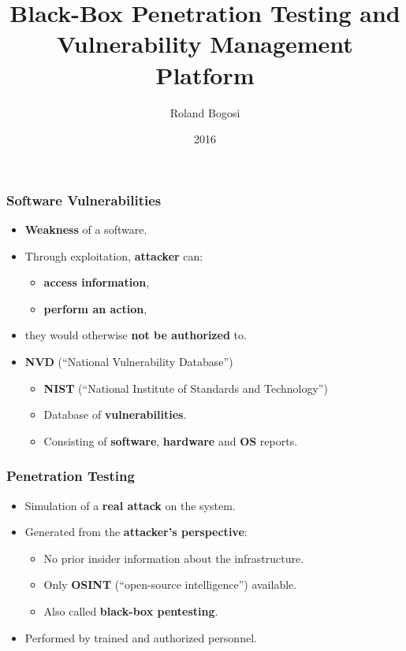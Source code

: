 \documentclass[aspectratio=169,xcolor={usenames,dvipsnames}]{beamer}
\title{Black-Box Penetration Testing and Vulnerability Management Platform}
\author{Roland Bogosi}
\date{2016}
\newcommand{\ispace}{\vspace{10pt}}
\begin{document}
	\frame{\titlepage}

\begin{frame}
	\frametitle{Software Vulnerabilities}
	
	\begin{itemize}
		\item \textbf{Weakness} of a software.
		\item Through exploitation, \textbf{attacker} can:
		\begin{itemize}
			\item \textbf{access information},
			\item \textbf{perform an action},
		\end{itemize}
		\item they would otherwise \textbf{not be authorized} to.
	\end{itemize}
	
	\ispace
	
	\begin{itemize}
		\item \textbf{NVD} (``National Vulnerability Database'')
		\begin{itemize}
			\item \textbf{NIST} (``National Institute of Standards and Technology'')
			\item Database of \textbf{vulnerabilities}.
			\item Consisting of \textbf{software}, \textbf{hardware} and \textbf{OS} reports.
		\end{itemize}
	\end{itemize}
\end{frame}

\begin{frame}
	\frametitle{Penetration Testing}
	
	\begin{itemize}
		\item Simulation of a \textbf{real attack} on the system.
		\item Generated from the \textbf{attacker's perspective}:
		\begin{itemize}
			\item No prior insider information about the infrastructure.
			\item Only \textbf{OSINT} (``open-source intelligence'') available.
			\item Also called \textbf{black-box pentesting}.
		\end{itemize}
		\item Performed by trained and authorized personnel.
	\end{itemize}
\end{frame}
\end{document}
